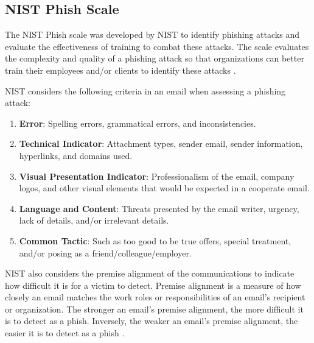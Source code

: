 \begin{fullwidth}
\section{NIST Phish Scale}
\label{sec:NIST Phish Scale}

The NIST Phish scale was developed by NIST to identify phishing attacks and evaluate the effectiveness of training to combat these attacks. The scale evaluates the complexity and quality of a phishing attack so that organizations can better train their employees and/or clients to identify these attacks \autocite{Dawkins:2023}.

NIST considers the following criteria in an email when assessing a phishing attack:
\begin{enumerate}
    \item \textbf{Error}: Spelling errors, grammatical errors, and inconsistencies.
    \item \textbf{Technical Indicator}: Attachment types, sender email, sender information, hyperlinks, and domains used.
    \item \textbf{Visual Presentation Indicator}: Professionalism of the email, company logos, and other visual elements that would be expected in a cooperate email. 
    \item \textbf{Language and Content}: Threats presented by the email writer, urgency, lack of details, and/or irrelevant details.
    \item \textbf{Common Tactic}: Such as too good to be true offers, special treatment, and/or posing as a friend/colleague/employer.
\end{enumerate}

NIST also considers the premise alignment of the communications to indicate how difficult it is for a victim to detect. Premise alignment is a measure of how closely an email matches the work roles or responsibilities of an email’s recipient or organization. The stronger an email’s premise alignment, the more difficult it is to detect as a phish. Inversely, the weaker an email’s premise alignment, the easier it is to detect as a phish \autocite{Dawkins:2023}.


\end{fullwidth}

